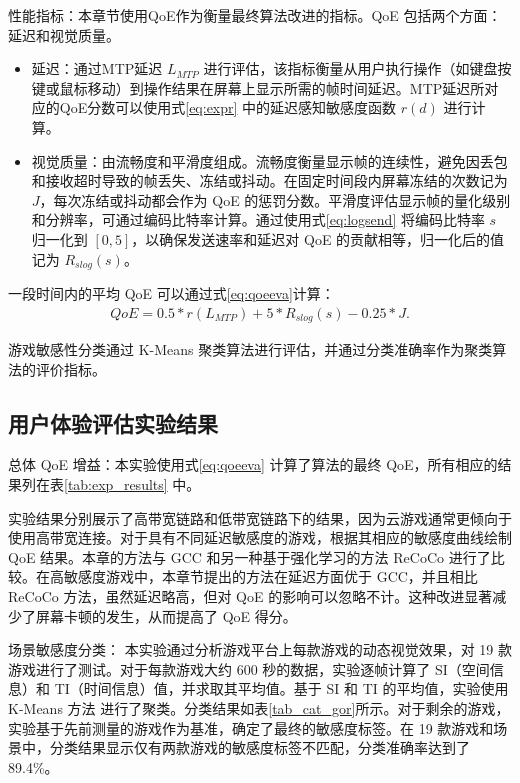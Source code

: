 性能指标：本章节使用QoE作为衡量最终算法改进的指标。QoE 包括两个方面：延迟和视觉质量。
\begin{itemize}
    \item 延迟：通过MTP延迟 $L_{MTP}$ \cite{alhilal2022nebula} 进行评估，该指标衡量从用户执行操作（如键盘按键或鼠标移动）到操作结果在屏幕上显示所需的帧时间延迟。MTP延迟所对应的QoE分数可以使用式\eqref{eq:expr} 中的延迟感知敏感度函数 $r(d)$ 进行计算。
    
    \item 视觉质量：由流畅度和平滑度组成。流畅度衡量显示帧的连续性，避免因丢包和接收超时导致的帧丢失、冻结或抖动。在固定时间段内屏幕冻结的次数记为 $J$，每次冻结或抖动都会作为 QoE 的惩罚分数。平滑度评估显示帧的量化级别和分辨率，可通过编码比特率计算。通过使用式\eqref{eq:logsend} 将编码比特率 $s$ 归一化到 $[0, 5]$，以确保发送速率和延迟对 QoE 的贡献相等，归一化后的值记为 $R_{slog}(s)$。
\end{itemize}


一段时间内的平均 QoE 可以通过式\eqref{eq:qoeeva}计算：
\begin{equation}
\begin{aligned}
    QoE = 0.5 * r(L_{MTP})  + 5 * R_{slog}(s) - 0.25 * J  .
\end{aligned}
\label{eq:qoeeva}
\end{equation}

游戏敏感性分类通过 K-Means 聚类算法进行评估，并通过分类准确率作为聚类算法的评价指标。

\subsection{用户体验评估实验结果}
总体 QoE 增益：本实验使用式\eqref{eq:qoeeva} 计算了算法的最终 QoE，所有相应的结果列在表\ref{tab:exp_results} 中。



实验结果分别展示了高带宽链路和低带宽链路下的结果，因为云游戏通常更倾向于使用高带宽连接。对于具有不同延迟敏感度的游戏，根据其相应的敏感度曲线绘制 QoE 结果。本章的方法与 GCC 和另一种基于强化学习的方法 ReCoCo 进行了比较。在高敏感度游戏中，本章节提出的方法在延迟方面优于 GCC，并且相比 ReCoCo 方法，虽然延迟略高，但对 QoE 的影响可以忽略不计。这种改进显著减少了屏幕卡顿的发生，从而提高了 QoE 得分。



场景敏感度分类： 本实验通过分析游戏平台上每款游戏的动态视觉效果，对 19 款游戏进行了测试。对于每款游戏大约 600 秒的数据，实验逐帧计算了 SI（空间信息）和 TI（时间信息）值，并求取其平均值。基于 SI 和 TI 的平均值，实验使用 K-Means 方法 \cite{ahmed2020k} 进行了聚类。分类结果如表\ref{tab_cat_gor}所示。对于剩余的游戏，实验基于先前测量的游戏作为基准，确定了最终的敏感度标签。在 19 款游戏和场景中，分类结果显示仅有两款游戏的敏感度标签不匹配，分类准确率达到了 89.4\%。






